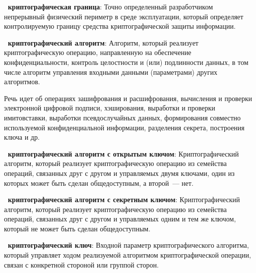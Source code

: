 {\bf \thedefctr~криптографическая граница}: 
Точно определенный разработчиком непрерывный физический периметр в среде
эксплуатации, который определяет контролируемую границу средства
криптографической защиты информации.


{\bf \thedefctr~криптографический алгоритм}:
Алгоритм, который реализует криптографическую операцию, направленную на
обеспечение конфиденциальности, контроль целостности и (или) подлинности данных,
в том числе алгоритм управления входными данными (параметрами) других
алгоритмов.

\begin{note}
Речь идет об операциях зашифрования и расшифрования, вычисления и проверки
электронной цифровой подписи, хэширования, выработки и проверки имитовставки,
выработки псевдослучайных данных, формирования совместно используемой
конфиденциальной информации, разделения секрета, построения ключа и др.
\end{note}



{\bf \thedefctr~криптографический алгоритм с открытым ключом}:
Криптографический алгоритм, который реализует криптографическую
операцию из семейства операций, связанных друг с другом и управляемых двумя 
ключами, один из которых может быть сделан общедоступным, а второй~--- нет.

{\bf \thedefctr~криптографический алгоритм с секретным ключом}:
Криптографический алгоритм, который реализует криптографическую
операцию из семейства операций, связанных друг с другом и управляемых одним и 
тем же ключом, который не может быть сделан общедоступным.  

{\bf \thedefctr~криптографический ключ}: 
Входной параметр криптографического алгоритма, который управляет ходом
реализуемой алгоритмом криптографической операции, связан с конкретной стороной
или группой сторон.


